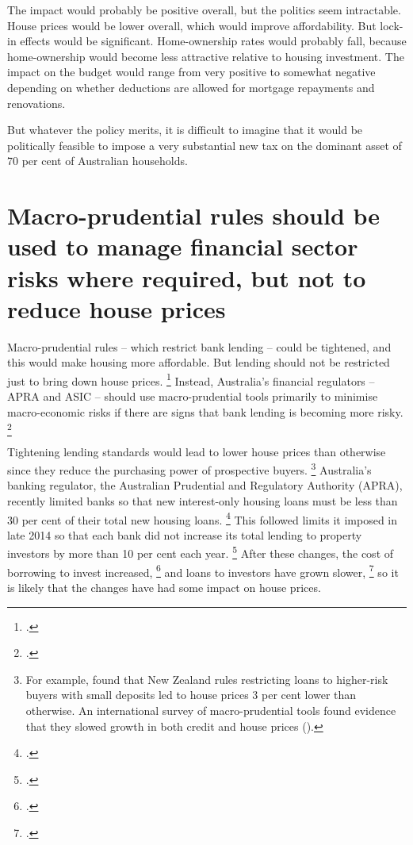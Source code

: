 The impact would probably be positive overall, but the politics seem intractable.
House prices would be lower overall, which would improve affordability.
But lock-in effects would be significant. Home-ownership rates would probably fall, because home-ownership would become less attractive relative to housing investment.
The impact on the budget would range from very positive to somewhat negative depending on whether deductions are allowed for mortgage repayments and renovations.

But whatever the policy merits, it is difficult to imagine that it would be politically feasible to impose a very substantial new tax on the dominant asset of 70 per cent of Australian households. 

\section{Macro-prudential rules should be used to manage financial sector risks where required, but not to reduce house prices}\label{sec:macro-prudential-rules-should-be-used-to-manage-financial-sector-risks-where-required-but-not-to-reduce-house-prices}

Macro-prudential rules -- which restrict bank lending -- could be tightened, and this would make housing more affordable.
But lending should not be restricted just to bring down house prices.%
	\footcite{Byres-2017-Prudential-perspectives-property-market}
Instead, Australia's financial regulators -- APRA and ASIC -- should use macro-prudential tools primarily to minimise macro-economic risks if there are signs that bank lending is becoming more risky.%
	\footcite{Orsmond-Price-2016-Macro-frameworks-tools}

Tightening lending standards would lead to lower house prices than otherwise since they reduce the purchasing power of prospective buyers.%
	\footnote{For example, \textcite{Price-2014-RBNZ-LVR-restriction-housing-market} found that New Zealand rules restricting loans to higher-risk buyers with small deposits led to house prices 3 per cent lower than otherwise.
    An international survey of macro-prudential tools found evidence that they slowed growth in both credit and house prices (\textcite{Cerutti-etal-2015-IMF-Effictiveness-Macro-policies}).}
Australia's banking regulator, the Australian Prudential and Regulatory Authority (APRA), recently limited banks so that new interest-only housing loans must be less than 30 per cent of their total new housing loans.%
	\footcite{APRA-2017-announcement-limit-interest-only-loans}
This followed limits it imposed in late 2014 so that each bank did not increase its total lending to property investors by more than 10 per cent each year.%
	\footcite{APRA-2014-announcement-limit-lending-below-10pc}
After these changes, the cost of borrowing to invest increased,%
	\footcite{Kent2017innovativemortgagedata}
and loans to investors have grown slower,%
	\footcite[][49]{RBAStatementonMonetaryPolicyAug17}
so it is likely that the changes have had some impact on house prices.

